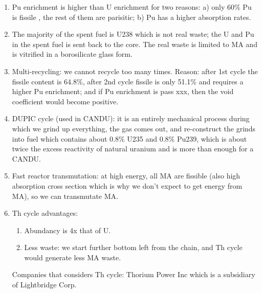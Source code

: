 \documentclass{school-22.211-notes}
\begin{document}
\begin{enumerate}

\item Pu enrichment is higher than U enrichment for two reasons: a) only 60\% Pu is fissile , the rest of them are parisitic; b) Pu has a higher absorption rates. 

\item The majority of the spent fuel is U238 which is not real waste; the U and Pu in the spent fuel is sent back to the core. The real waste is limited to MA and is vitrified in a borosilicate glass form. 

\item Multi-recycling: we cannot recycle too many times. Reason: after 1st cycle the fissile content is 64.8\%, after 2nd cycle fissile is only 51.1\% and requires a higher Pu enrichment; and if Pu enrichment is pass xxx, then the void coefficient would become positive. 

\item DUPIC cycle (used in CANDU): it is an entirely mechanical process during which we grind up everything, the gas comes out, and re-construct the grinds into fuel which contains about 0.8\% U235 and 0.8\% Pu239, which is about twice the excess reactivity of natural uranium and is more than enough for a CANDU.

\item Fast reactor transmutation: at high energy, all MA are fissible (also high absorption cross section which is why we don't expect to get energy from MA), so we can transmutate MA.  


\item Th cycle advantages: 
\begin{enumerate}
\item Abundancy is 4x that of U. 
\item Less waste:  we start further bottom left from the chain, and Th cycle would generate less MA waste. 

\end{enumerate}
Companies that considers Th cycle: Thorium Power Inc which is a subsidiary of Lightbridge Corp. 
\end{enumerate}
\end{document}
